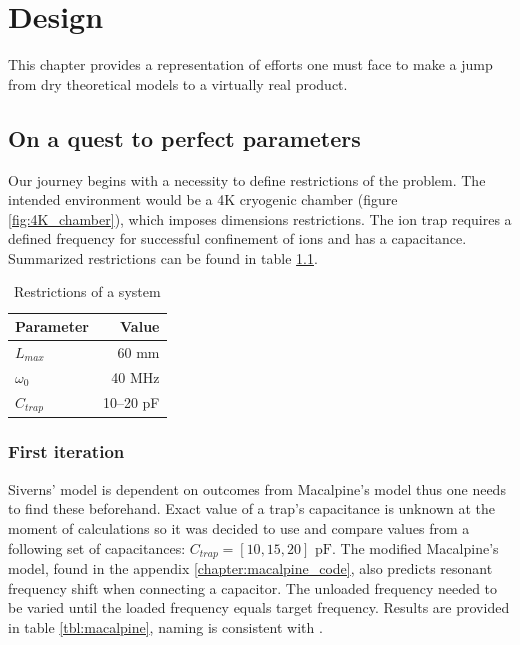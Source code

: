 \chapter{Design}
This chapter provides a representation of efforts one must face to make a jump from dry theoretical models to a virtually real product.

\section{On a quest to perfect parameters}
Our journey begins with a necessity to define restrictions of the problem. The intended environment would be a 4K cryogenic chamber (figure \ref{fig:4K_chamber}), which imposes dimensions restrictions. The ion trap requires a defined frequency for successful confinement of ions and has a capacitance. Summarized restrictions can be found in table \ref{tbl:restrictions}.

\begin{table}[h]
\centering
\begin{tabular}{| l | r |}
	\hline
	Parameter & Value \\
	\hline \hline
	$L_{max}$ & 60 mm \\
	\hline
	$\omega_0$ & 40 MHz \\
	\hline
	$C_{trap}$ & 10--20 pF \\
	\hline
\end{tabular}	
\caption{Restrictions of a system}
\label{tbl:restrictions}
\end{table}

\subsection{First iteration}
Siverns' model \cite{Siverns2012} is dependent on outcomes from Macalpine's model \cite{Macalpine2000} thus one needs to find these beforehand. Exact value of a trap's capacitance is unknown at the moment of calculations so it was decided to use and compare values from a following set of capacitances: $C_{trap} = [10, 15, 20]\text{ pF}$. The modified Macalpine's model, found in the appendix \ref{chapter:macalpine_code}, also predicts resonant frequency shift when connecting a capacitor. The unloaded frequency needed to be varied until the loaded frequency equals target frequency. Results are provided in table \ref{tbl:macalpine}, naming is consistent with \cite{Macalpine2000}.

